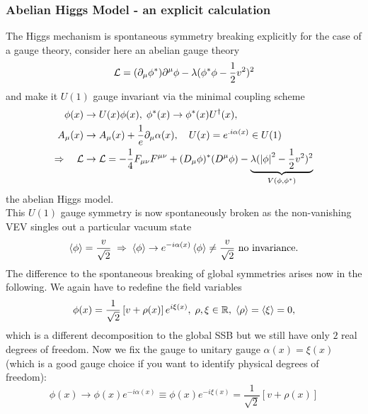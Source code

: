 \subsubsection{Abelian Higgs Model - an explicit calculation}
The Higgs mechanism is spontaneous symmetry breaking explicitly for the case of a gauge theory, consider here an abelian gauge theory 
\begin{equation}
\mathcal{L} = (\partial_\mu \phi^*) \partial^\mu \phi - \lambda (\phi^* \phi - \frac{1}{2} v^2)^2
\end{equation}
and make it $U(1)$ gauge invariant via the minimal coupling scheme
\begin{align}
	\phi(x) & \rightarrow U(x) \phi(x), \; \phi^*(x) \rightarrow \phi^*(x) U^\dagger(x),\\
	A_\mu(x) &\rightarrow A_\mu(x) + \frac{1}{e} \partial_\mu \alpha(x), \quad U(x)=e^{.i\alpha(x)} \in U(1)\\
	\Rightarrow\quad \mathcal{L} &\rightarrow\mathcal{L} = -\frac{1}{4} F_{\mu \nu} F^{\mu \nu} + (D_\mu \phi)^* (D^\mu \phi) - \underbrace{\lambda(\abs{\phi}^2-\frac{1}{2} v^2)^2}_{V(\phi,\phi^*)} 
\end{align}
the abelian Higgs model.\\
This $U(1)$ gauge symmetry is now spontaneously broken as the non-vanishing VEV singles out a particular vacuum state
\begin{equation}
\expval{\phi}=\frac{v}{\sqrt{2}} \;\Rightarrow \; \expval{\phi}\rightarrow e^{-i\alpha(x)} \expval{\phi}\neq \frac{v}{\sqrt{2}} \text{ no invariance}.
\end{equation}
The difference to the spontaneous breaking of global symmetries arises now in the following. We again have to redefine the field variables
\begin{equation}
\phi(x) = \frac{1}{\sqrt{2}} \left[v+\rho(x)\right] e^{i \xi(x)}, \; \rho,\xi \in \mathbb{R}, \; \expval{\rho} = \expval{\xi} =0,
\end{equation}
which is a different decomposition to the global SSB but we still have only $2$ real degrees of freedom. Now we fix the gauge to unitary gauge $\alpha(x) =\xi(x)$ (which is a good gauge choice if you want to identify physical degrees of freedom):
\begin{equation}
\phi(x) \rightarrow\phi(x) e^{-i\alpha(x)} \equiv \phi(x) e^{-i\xi(x)} = \frac{1}{\sqrt{2}} [v+\rho(x)]
\end{equation}

